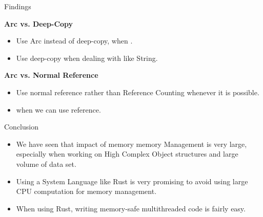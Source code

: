 \documentclass[9pt]{beamer}
\begin{document}

\begin{frame}[fragile]{Findings}

\textbf{Arc vs. Deep-Copy}

    \begin{itemize}
        \item Use Arc instead of deep-copy, when .
        \item Use deep-copy when dealing with  like String.
    \end{itemize}

\textbf{Arc vs. Normal Reference}

    \begin{itemize}

        \item Use normal reference rather than Reference Counting whenever it is possible.
        \item {} when we can use reference.
    \end{itemize}
\end{frame}


\begin{frame}[fragile]{Conclusion}
    \begin{itemize}
        \item We have seen that impact of memory memory Management is very large, 
              especially when working on High Complex Object structures and large volume of data set. 

        \item Using a System Language like Rust is very promising to avoid using large CPU computation for memory management. 
        \item When using Rust, writing memory-safe multithreaded code is fairly easy.
         
    \end{itemize}
\end{frame}
\end{document}
